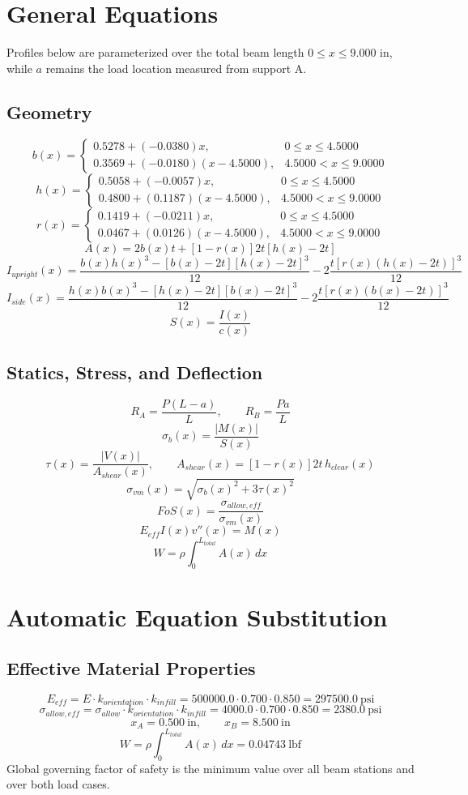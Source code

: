 \documentclass[11pt]{article}
\begin{document}
\section*{General Equations}
Profiles below are parameterized over the total beam length $0 \le x \le 9.000$ in, while $a$ remains the load location measured from support A.
\subsection*{Geometry}
\[
b(x)=\begin{cases}0.5278 + (-0.0380)x, & 0 \le x \le 4.5000\\0.3569 + (-0.0180)(x-4.5000), & 4.5000 < x \le 9.0000\end{cases}
\]
\[
h(x)=\begin{cases}0.5058 + (-0.0057)x, & 0 \le x \le 4.5000\\0.4800 + (0.1187)(x-4.5000), & 4.5000 < x \le 9.0000\end{cases}
\]
\[
r(x)=\begin{cases}0.1419 + (-0.0211)x, & 0 \le x \le 4.5000\\0.0467 + (0.0126)(x-4.5000), & 4.5000 < x \le 9.0000\end{cases}
\]
\[
A(x)=2b(x)t+[1-r(x)]2t[h(x)-2t]
\]
\[
I_{upright}(x)=\frac{b(x)h(x)^3-[b(x)-2t][h(x)-2t]^3}{12}-2\frac{t[r(x)(h(x)-2t)]^3}{12}
\]
\[
I_{side}(x)=\frac{h(x)b(x)^3-[h(x)-2t][b(x)-2t]^3}{12}-2\frac{t[r(x)(b(x)-2t)]^3}{12}
\]
\[
S(x)=\frac{I(x)}{c(x)}
\]

\subsection*{Statics, Stress, and Deflection}
\[
R_A=\frac{P(L-a)}{L}, \qquad R_B=\frac{Pa}{L}
\]
\[
\sigma_b(x)=\frac{|M(x)|}{S(x)}
\]
\[
\tau(x)=\frac{|V(x)|}{A_{shear}(x)}, \qquad A_{shear}(x)=[1-r(x)]2t\,h_{clear}(x)
\]
\[
\sigma_{vm}(x)=\sqrt{\sigma_b(x)^2+3\tau(x)^2}
\]
\[
FoS(x)=\frac{\sigma_{allow,eff}}{\sigma_{vm}(x)}
\]
\[
E_{eff}I(x)v''(x)=M(x)
\]
\[
W=\rho\int_0^{L_{total}} A(x)\,dx
\]

\section*{Automatic Equation Substitution}
\subsection*{Effective Material Properties}
\[E_{eff} = E \cdot k_{orientation} \cdot k_{infill} = 500000.0 \cdot 0.700 \cdot 0.850 = 297500.0\ \mathrm{psi}\]
\[\sigma_{allow,eff} = \sigma_{allow} \cdot k_{orientation} \cdot k_{infill} = 4000.0 \cdot 0.700 \cdot 0.850 = 2380.0\ \mathrm{psi}\]
\[x_A = 0.500\ \mathrm{in}, \qquad x_B = 8.500\ \mathrm{in}\]
\[W = \rho \int_0^{L_{total}} A(x)\,dx = 0.04743\ \mathrm{lbf}\]
Global governing factor of safety is the minimum value over all beam stations and over both load cases.
\end{document}
